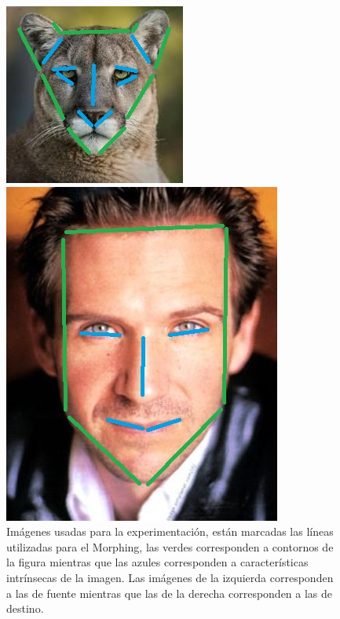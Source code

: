 \documentclass[conference]{IEEEtran}
\begin{document}
\begin{figure}[H]
\begin{multicols}{2}
    \includegraphics[width=0.98\linewidth]{cats/2 lines.jpg} \par
    \includegraphics[width=0.98\linewidth]{faces/2 lines.jpg} \par
\end{multicols}
\caption{Imágenes usadas para la experimentación, están marcadas las líneas utilizadas para el Morphing, las verdes corresponden a contornos de la figura mientras que las azules corresponden a características intrínsecas de la imagen. Las imágenes de la izquierda corresponden a las de fuente mientras que las de la derecha corresponden a las de destino.}
\end{figure}
	
\end{document}
